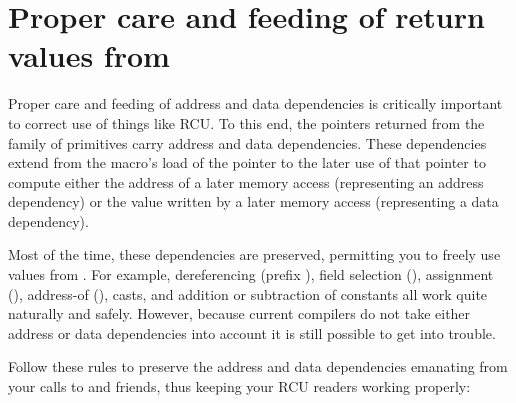 \section{Proper care and feeding of return values from }
\label{sec:rcu:Proper care and feeding of return values from rcu_dereference()}

Proper care and feeding of address and data dependencies is critically
important to correct use of things like RCU\@.
To this end, the pointers
returned from the  family of primitives carry address and
data dependencies.
These dependencies extend from the 
macro's load of the pointer to the later use of that pointer to compute
either the address of a later memory access (representing an address
dependency) or the value written by a later memory access (representing
a data dependency).

Most of the time, these dependencies are preserved, permitting you to
freely use values from .
For example, dereferencing
(prefix \qco{*}), field selection (\qtco{->}), assignment (\qco{=}), address-of
(\qco{&}), casts, and addition or subtraction of constants all work quite
naturally and safely.
However, because current compilers do not take
either address or data dependencies into account it is still possible
to get into trouble.

Follow these rules to preserve the address and data dependencies emanating
from your calls to  and friends, thus keeping your RCU
readers working properly:


